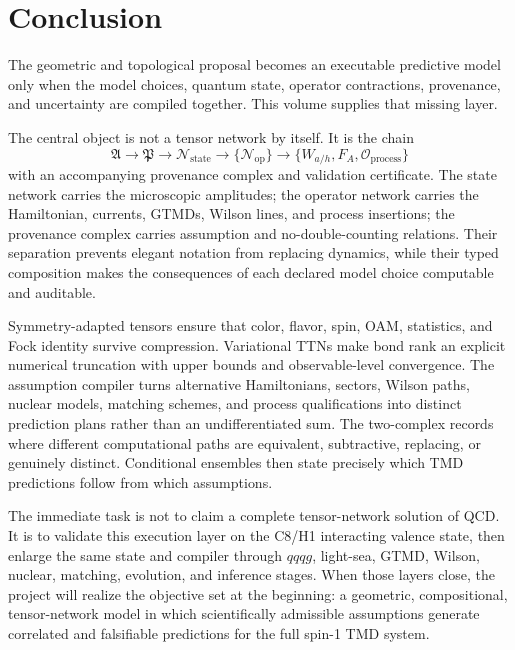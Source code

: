 \documentclass[11pt]{article}
\newcommand{\cO}{\mathcal O}
\newcommand{\Aset}{\mathfrak A}
\newcommand{\Pplan}{\mathfrak P}
\newcommand{\Nstate}{\mathcal N_{\mathrm{state}}}
\newcommand{\Nop}{\mathcal N_{\mathrm{op}}}
\begin{document}
\section{Conclusion}
\label{sec:conclusion}

The geometric and topological proposal becomes an executable predictive model
only when the model choices, quantum state, operator contractions, provenance,
and uncertainty are compiled together.  This volume supplies that missing
layer.

The central object is not a tensor network by itself.  It is the chain
\begin{equation}
 \boxed{
 \Aset
 \longrightarrow
 \Pplan
 \longrightarrow
 \Nstate
 \longrightarrow
 \{\Nop\}
 \longrightarrow
 \{W_{a/h},F_A,\cO_{\mathrm{process}}\}
 }
\label{eq:final-chain}
\end{equation}
with an accompanying provenance complex and validation certificate.  The state
network carries the microscopic amplitudes; the operator network carries the
Hamiltonian, currents, GTMDs, Wilson lines, and process insertions; the
provenance complex carries assumption and no-double-counting relations.  Their
separation prevents elegant notation from replacing dynamics, while their
typed composition makes the consequences of each declared model choice
computable and auditable.

Symmetry-adapted tensors ensure that color, flavor, spin, OAM, statistics, and
Fock identity survive compression.  Variational TTNs make bond rank an explicit
numerical truncation with upper bounds and observable-level convergence.
The assumption compiler turns alternative Hamiltonians, sectors, Wilson paths,
nuclear models, matching schemes, and process qualifications into distinct
prediction plans rather than an undifferentiated sum.  The two-complex records
where different computational paths are equivalent, subtractive, replacing,
or genuinely distinct.  Conditional ensembles then state precisely which TMD
predictions follow from which assumptions.

The immediate task is not to claim a complete tensor-network solution of QCD.
It is to validate this execution layer on the C8/H1 interacting valence state,
then enlarge the same state and compiler through \(qqqg\), light-sea, GTMD,
Wilson, nuclear, matching, evolution, and inference stages.  When those layers
close, the project will realize the objective set at the beginning: a
geometric, compositional, tensor-network model in which scientifically
admissible assumptions generate correlated and falsifiable predictions for the
full spin-1 TMD system.
\end{document}
